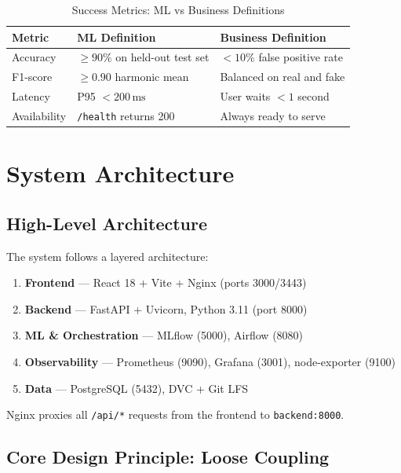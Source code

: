 \documentclass[conference]{IEEEtran}
\begin{document}
\begin{table}[H]
\centering
\caption{Success Metrics: ML vs Business Definitions}
\label{tab:success}
\begin{tabular}{@{}L{1.5cm}L{2.8cm}L{3cm}@{}}
\toprule
\textbf{Metric} & \textbf{ML Definition} & \textbf{Business Definition} \\
\midrule
Accuracy   & $\geq 90\%$ on held-out test set & $< 10\%$ false positive rate \\
F1-score   & $\geq 0.90$ harmonic mean & Balanced on real and fake \\
Latency    & P95 $< 200\,\text{ms}$  & User waits $< 1$ second \\
Availability & \texttt{/health} returns 200 & Always ready to serve \\
\bottomrule
\end{tabular}
\end{table}

\section{System Architecture}
\label{sec:arch}

\subsection{High-Level Architecture}

The system follows a layered architecture:
\begin{enumerate}[noitemsep]
  \item \textbf{Frontend} — React 18 + Vite + Nginx (ports 3000/3443)
  \item \textbf{Backend} — FastAPI + Uvicorn, Python 3.11 (port 8000)
  \item \textbf{ML \& Orchestration} — MLflow (5000), Airflow (8080)
  \item \textbf{Observability} — Prometheus (9090), Grafana (3001), node-exporter (9100)
  \item \textbf{Data} — PostgreSQL (5432), DVC + Git LFS
\end{enumerate}

Nginx proxies all \texttt{/api/*} requests from the frontend to \texttt{backend:8000}.

\subsection{Core Design Principle: Loose Coupling}
\end{document}
